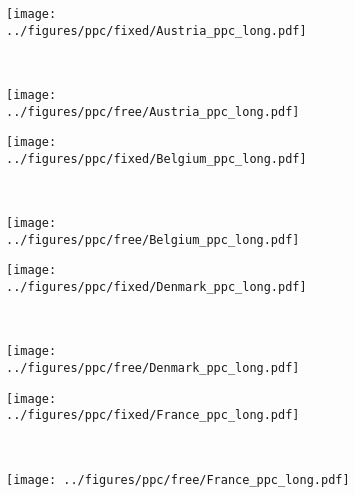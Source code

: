 \documentclass[12pt]{extarticle}
\begin{document}
\begin{figure}[h]	
    \centering
    \begin{subfigure}{0.45\textwidth}
        \texttt{[image: ../figures/ppc/fixed/Austria\_ppc\_long.pdf]}
    \end{subfigure}
    \label{fig:ppc}
    ~
    \begin{subfigure}{0.45\textwidth}
        \texttt{[image: ../figures/ppc/free/Austria\_ppc\_long.pdf]}
    \end{subfigure}
    \begin{subfigure}{0.45\textwidth}
        \texttt{[image: ../figures/ppc/fixed/Belgium\_ppc\_long.pdf]}
    \end{subfigure}
    ~
    \begin{subfigure}{0.45\textwidth}
        \texttt{[image: ../figures/ppc/free/Belgium\_ppc\_long.pdf]}
    \end{subfigure}
     \begin{subfigure}{0.45\textwidth}
        \texttt{[image: ../figures/ppc/fixed/Denmark\_ppc\_long.pdf]}
    \end{subfigure}
    ~
    \begin{subfigure}{0.45\textwidth}
        \texttt{[image: ../figures/ppc/free/Denmark\_ppc\_long.pdf]}
    \end{subfigure}
    \begin{subfigure}{0.45\textwidth}
        \texttt{[image: ../figures/ppc/fixed/France\_ppc\_long.pdf]}
    \end{subfigure}
    ~
    \begin{subfigure}{0.45\textwidth}
        \texttt{[image: ../figures/ppc/free/France\_ppc\_long.pdf]}
    \end{subfigure}
\end{figure}
\end{document}
